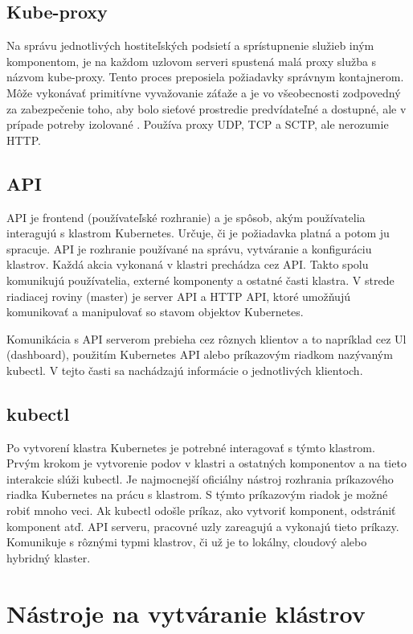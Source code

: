 \subsection*{Kube-proxy}
Na správu jednotlivých hostiteľských podsietí a sprístupnenie služieb iným komponentom, je na každom uzlovom serveri spustená malá proxy služba s názvom kube-proxy. Tento proces preposiela požiadavky správnym kontajnerom. Môže vykonávať primitívne vyvažovanie záťaže a je vo všeobecnosti zodpovedný za zabezpečenie toho, aby bolo sieťové prostredie predvídateľné a dostupné, ale v prípade potreby izolované \cite{kubeproxy}. Používa proxy UDP, TCP a SCTP, ale nerozumie HTTP.

\subsection{API}

API je frontend (používateľské rozhranie) a je spôsob, akým používatelia interagujú s klastrom Kubernetes. Určuje, či je požiadavka platná a potom ju spracuje. API je rozhranie používané na správu, vytváranie a konfiguráciu klastrov. Každá akcia vykonaná v klastri prechádza cez API. Takto spolu komunikujú používatelia, externé komponenty a ostatné časti klastra. V strede riadiacej roviny (master) je server API a HTTP API, ktoré umožňujú komunikovať a manipulovať so stavom objektov Kubernetes.

Komunikácia s API serverom prebieha cez rôznych klientov a to napríklad cez Ul (dashboard), použitím Kubernetes API alebo príkazovým riadkom nazývaným kubectl. V tejto časti sa nachádzajú informácie o jednotlivých klientoch.

\subsection*{kubectl}

Po vytvorení klastra Kubernetes je potrebné interagovať s týmto klastrom. Prvým krokom je vytvorenie podov v klastri a ostatných komponentov a na tieto interakcie slúži kubectl. Je najmocnejší oficiálny nástroj rozhrania príkazového riadka Kubernetes na prácu s klastrom. S týmto príkazovým riadok je možné robiť mnoho veci. Ak kubectl odošle príkaz, ako vytvoriť komponent, odstrániť komponent atď. API serveru, pracovné uzly zareagujú a vykonajú tieto príkazy. Komunikuje s rôznými typmi klastrov, či už je to lokálny, cloudový alebo hybridný klaster.

\section{Nástroje na vytváranie klástrov}

